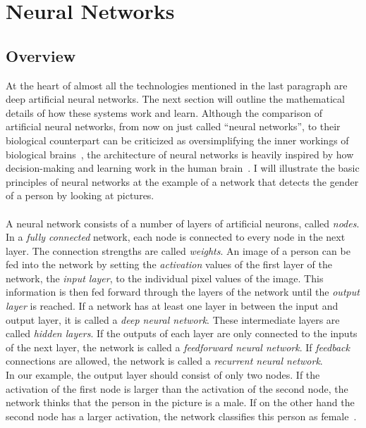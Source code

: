 \chapter{Neural Networks}
\label{ch:neural-networks}
\section{Overview}
\label{sec:overview}
At the heart of almost all the technologies mentioned in the last paragraph are deep artificial neural networks.
The next section will outline the mathematical details of how these systems work and learn.
Although the comparison of artificial neural networks, from now on just called “neural networks”, to their biological counterpart can be criticized as oversimplifying the inner workings of biological brains~\cite[chapter 1.1]{aggarwal_neural_2018}, the architecture of neural networks is heavily inspired by how decision-making and learning work in the human brain~\cite[chapter 1.1]{aggarwal_neural_2018, mit_nnexplained}.
I will illustrate the basic principles of neural networks at the example of a network that detects the gender of a person by looking at pictures.
\\
\\
A neural network consists of a number of layers of artificial neurons, called \textit{nodes}.
In a \textit{fully connected} network, each node is connected to every node in the next layer.
The connection strengths are called \textit{weights}.
An image of a person can be fed into the network by setting the \textit{activation} values of the first layer of the network, the \textit{input layer}, to the individual pixel values of the image.
This information is then fed forward through the layers of the network until the \textit{output layer} is reached.
If a network has at least one layer in between the input and output layer, it is called a \textit{deep neural network}.
These intermediate layers are called \textit{hidden layers}.
If the outputs of each layer are only connected to the inputs of the next layer, the network is called a \textit{feedforward neural network}.
If \textit{feedback} connections are allowed, the network is called a \textit{recurrent neural network}.
\\
In our example, the output layer should consist of only two nodes.
If the activation of the first node is larger than the activation of the second node, the network thinks that the person in the picture is a male.
If on the other hand the second node has a larger activation, the network classifies this person as female~\cite[chapter 1.2]{aggarwal_neural_2018}.
